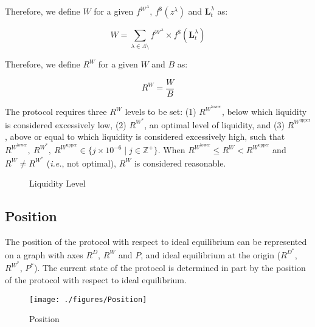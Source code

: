 \documentclass[tikz]{article}
\newcommand{\pinto}{} %
\begin{document}
Therefore, we define $W$ for a given $f^{\mathscr{W}^{\lambda}}$, $f^{\$}(z^{\lambda})$ and $\mathbf{L}_{t}^{\lambda}$ as:

    $$
        W = \sum_{\lambda \in \Lambda \setminus \pinto} 
                    f^{\mathscr{W}^{\lambda}} \times 
                        f^{\$}(\mathbf{L}_{t}^{\lambda})
    $$

Therefore, we define $R^{W}$ for a given $W$ and $B$ as:

    $$
        R^{W} = \frac{W}{B}
    $$

\newpage 

The protocol requires three $R^{W}$ levels to be set: (1) $R^{W^{\text{lower}}}$, below which liquidity is considered excessively low, (2) $R^{W^{*}}$, an optimal level of liquidity, and (3) $R^{W^{\text{upper}}}$, above or equal to which liquidity is considered excessively high, such that $R^{W^{\text{lower}}},\ R^{W^{*}},\ R^{W^{\text{upper}}} \in \{j \times 10^{-6} \mid j \in \mathbb{Z}^{+} \}$. When $R^{W^{\text{lower}}} \leq R^{W} < R^{W^{\text{upper}}}$ and $R^{W} \neq R^{W^{*}}$ (\textit{i.e.}, not optimal), $R^{W}$ is considered reasonable.

\begin{figure}[h!]
    \centering
    
    \vspace*{-7mm}
    \setlength{\belowcaptionskip}{-8pt} %
    \caption{Liquidity Level}
    \label{Liquidity Level}
\end{figure}


\subsection{Position}

The position of the protocol with respect to ideal equilibrium can be represented on a graph with axes $R^{D}$, $R^{W}$ and $P$, and ideal equilibrium at the origin ($R^{D^{*}}$, $R^{W^{*}}$, $P^{*}$). The current state of the protocol is determined in part by the position of the protocol with respect to ideal equilibrium. 


\begin{figure}[h!]
    \centering
    \texttt{[image: ./figures/Position]} %
    \caption{Position}
    \label{Position}
\end{figure}
\end{document}
